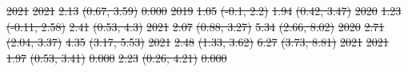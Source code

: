 \documentclass[
  letterpaper,
  DIV=11,
  numbers=noendperiod]{scrartcl}
\makeatletter
\renewenvironment{table}%
   {\renewcommand\familydefault\sfdefault
    \@float{table}}
   {\end@float}
\providecommand{\DIFdel}[1]{{\protect\color{red}\sout{#1}}}                      %
\providecommand{\DIFdelFL}[1]{\DIFdel{#1}} %
\providecommand{\DIFaddbeginFL}{} %
\providecommand{\DIFdelendFL}{} %
\newcommand{\DIFaddincludegraphics}[2][]{{\color{blue}\fbox{\DIFOincludegraphics[#1]{#2}}}} %
\DeclareRobustCommand{\DIFaddbeginFL}{\DIFOaddbeginFL \let\includegraphics\DIFaddincludegraphics} %
\DeclareRobustCommand{\DIFdelendFL}{\DIFOaddendFL \let\includegraphics\DIFOincludegraphics} %
\makeatother
\begin{document}
\begin{table}
\DIFdelFL{\hspace{1em}2021 }%
\DIFdelFL{2021 }%
\DIFdelFL{2.13 }%
\DIFdelFL{(0.67, 3.59) }%
\DIFdelFL{0.000 }%
\DIFdelFL{2019 }%
\DIFdelFL{1.05 }%
\DIFdelFL{(-0.1, 2.2) }%
\DIFdelFL{1.94 }%
\DIFdelFL{(0.42, 3.47) }%
\DIFdelFL{2020 }%
\DIFdelFL{1.23 }%
\DIFdelFL{(-0.11, 2.58) }%
\DIFdelFL{2.41 }%
\DIFdelFL{(0.53, 4.3) }%
\DIFdelFL{2021 }%
\DIFdelFL{2.07 }%
\DIFdelFL{(0.88, 3.27) }%
\DIFdelFL{5.34 }%
\DIFdelFL{(2.66, 8.02) }%
\DIFdelFL{2020 }%
\DIFdelFL{2.71 }%
\DIFdelFL{(2.04, 3.37) }%
\DIFdelFL{4.35 }%
\DIFdelFL{(3.17, 5.53) }%
\DIFdelFL{2021 }%
\DIFdelFL{2.48 }%
\DIFdelFL{(1.33, 3.62) }%
\DIFdelFL{6.27 }%
\DIFdelFL{(3.73, 8.81) }%
\DIFdelFL{\hspace{1em}2021 }%
\DIFdelFL{2021 }%
\DIFdelFL{1.97 }%
\DIFdelFL{(0.53, 3.41) }%
\DIFdelFL{0.000 }%
\DIFdelFL{2.23 }%
\DIFdelFL{(0.26, 4.21) }%
\DIFdelFL{0.000}%
\DIFdelendFL \DIFaddbeginFL \centering{

}
\end{table}
\end{document}
